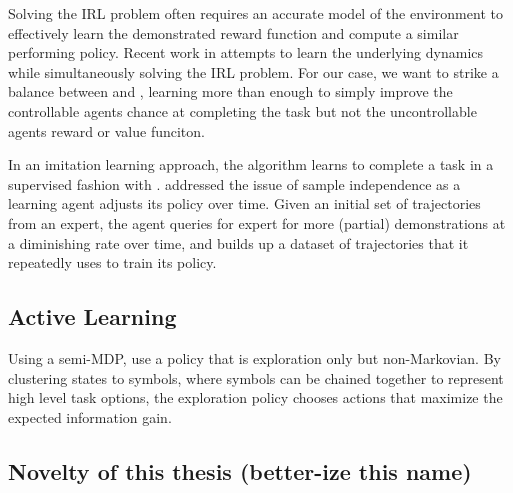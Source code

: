     Solving the IRL problem often requires an accurate model of the environment to effectively learn the demonstrated
    reward function and compute a similar performing policy. Recent work in \cite{herman2016inverse} attempts to learn
    the underlying dynamics while simultaneously solving the IRL problem. For our case, we want to strike a balance
    between \cite{bandyopadhyay2013intention} and \cite{herman2016inverse}, learning more than enough to simply improve
    the controllable agents chance at completing the task but not the uncontrollable agents reward or value funciton.

    In an imitation learning approach, the \DAGGER algorithm learns to complete a task in a supervised fashion with
    \cite{ross2011reduction}. \DAGGER addressed the issue of sample independence as a learning agent adjusts its policy
    over time.  Given an initial set of trajectories from an expert, the agent queries for expert for more (partial)
    demonstrations at a diminishing rate over time, and builds up a dataset of trajectories that it repeatedly uses to
    train its policy.

\subsection{Active Learning}

    Using a semi-MDP,  \cite{andersen2017active} use a policy that is exploration only but non-Markovian.  By clustering
    states to symbols, where symbols can be chained together to represent high level task options, the exploration
    policy chooses actions that maximize the expected information gain.


\subsection{Novelty of this thesis (better-ize this name)}\label{sec:literature_novelty}

